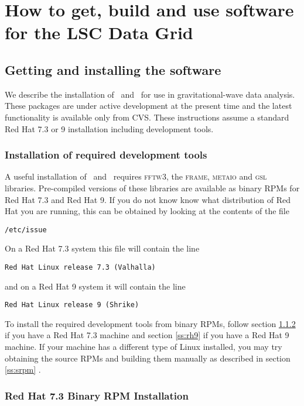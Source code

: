 %
%
\color{black}
\chapter{How to get, build and use software for the LSC Data Grid} 
\section{Getting and installing the software}

We describe the installation of \lal\ and \lalapps\ for use in
gravitational-wave data analysis.   These packages are under active
development at the present time and the latest functionality is
available only from CVS.   These instructions assume a standard
Red Hat 7.3 or 9 installation including development tools.   

\subsection{Installation of required development tools}

A useful installation of \lal\ and \lalapps\ requires \textsc{fftw3},
the \textsc{frame}, \textsc{metaio} and \textsc{gsl} libraries.   Pre-compiled
versions of these libraries are available as binary RPMs for Red Hat 7.3 and
Red Hat 9. If you do not know know what distribution of Red Hat you are
running, this can be obtained by looking at the contents of the file 
\begin{verbatim}
/etc/issue
\end{verbatim}
On a Red Hat 7.3 system this file will contain the line
\begin{verbatim}
Red Hat Linux release 7.3 (Valhalla)
\end{verbatim}
and on a Red Hat 9 system it will contain the line
\begin{verbatim}
Red Hat Linux release 9 (Shrike)
\end{verbatim}
To install the required development tools from binary RPMs, follow section
\ref{ss:rh73} if you have a Red Hat 7.3 machine and section \ref{ss:rh9} if
you have a Red Hat 9 machine. If your machine has a different type of Linux
installed, you may try obtaining the source RPMs and building them manually as
described in section \ref{ss:srpm} .

\subsection{Red Hat 7.3 Binary RPM Installation}
\label{ss:rh73}

